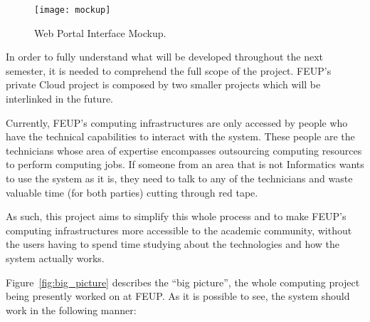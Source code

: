 	
\begin{figure}[t]
  \begin{center}
    \leavevmode
    \texttt{[image: mockup]}
    \caption{Web Portal Interface Mockup.}
    \label{fig:mockup}
  \end{center}
\end{figure}


In order to fully understand what will be developed throughout the next semester, it is needed to comprehend the full scope of the project.
FEUP's private Cloud project is composed by two smaller projects which will be interlinked in the future.
	
Currently, FEUP's computing infrastructures are only accessed by people who have the technical capabilities to interact with the system. These people are the technicians whose area of expertise encompasses outsourcing computing resources to perform computing jobs. If someone from an area that is not Informatics wants to use the system as it is, they need to talk to any of the technicians and waste valuable time (for both parties) cutting through red tape.

As such, this project aims to simplify this whole process and to make FEUP's computing infrastructures more accessible to the academic community, without the users having to spend time studying about the technologies and how the system actually works.

Figure~\ref{fig:big_picture} describes the ``big picture'', the whole computing project being presently worked on at FEUP. As it is possible to see, the system should work in the following manner:


